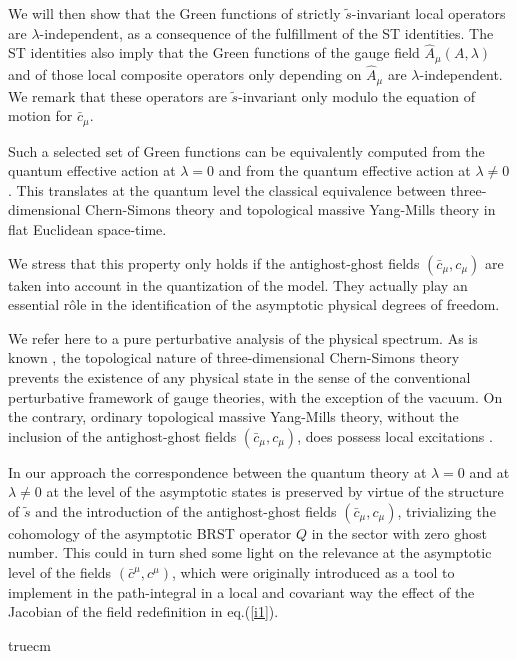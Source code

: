 \documentclass[a4paper,11pt]{article}
\begin{document}
We will then show that the Green functions of strictly $\tilde s$-invariant
local operators are $\lambda$-independent, as a consequence of the fulfillment
of the ST identities.
%
The ST identities also imply that  
 the Green functions of the gauge field $\hat A_\mu(A,\lambda)$
and of those local composite operators only depending on $\hat A_\mu$
are  $\lambda$-indepen\-dent.
We remark that these operators are $\tilde s$-invariant
only modulo the equation of motion
for $\bar c_\mu$.
%

Such a selected set of Green functions 
can be equivalently computed from the quantum effective action
at $\lambda=0$ and from the quantum effective action at $\lambda \neq 0$.
This translates at the quantum level the classical equivalence
between three-dimensional Chern-Simons theory and topological massive
Yang-Mills theory in flat Euclidean space-time.


We stress that this property only holds if the antighost-ghost fields
$(\bar c_\mu,c_\mu)$ are taken into account in the quantization
of the model. They actually play an essential r\^ole in the identification
of the asymptotic physical degrees of freedom.

We refer here to a pure perturbative
analysis of the physical spectrum. As is known \cite{Guadagnini:1989kr}, 
the topological
nature of three-dimensional Chern-Simons theory prevents 
the existence
of any physical state in the sense of the conventional perturbative framework of gauge theories, with the exception of the vacuum.
%
On the contrary, ordinary topological massive Yang-Mills theory, without
the inclusion of the antighost-ghost fields $(\bar c_\mu, c_\mu)$,
does possess local excitations \cite{top_mass}.

In our approach 
the correspondence between the quantum theory at $\lambda=0$ and
at $\lambda \neq 0$ at the level of the asymptotic states is
preserved by virtue of the structure of $\tilde s$ and 
 the introduction of the antighost-ghost fields $(\bar c_\mu,c_\mu)$,
trivializing the cohomology of the asymptotic BRST operator $Q$
in the sector with zero ghost number.
%
This could in turn shed some light on the relevance at the 
asymptotic level
of the 
fields $(\bar c^\mu,c^\mu)$, which were 
originally introduced \cite{ET}
 as a tool to implement  in the path-integral
in a local and covariant way
the effect 
of the Jacobian of the field redefinition in eq.(\ref{i1}).


 truecm
\end{document}
